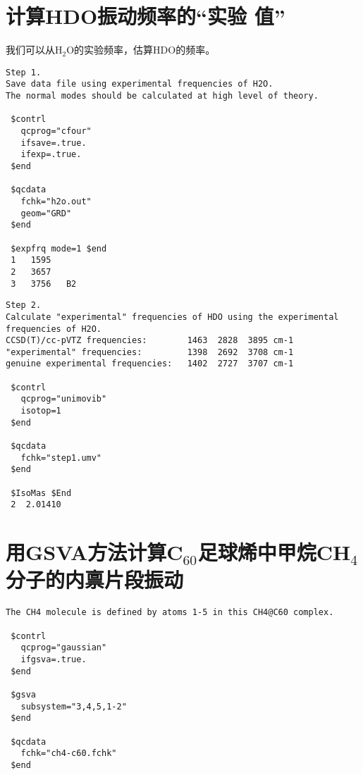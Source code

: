 \documentclass[12pt,a4paper,openany,twoside,cap,UTF8]{ctexbook}
\begin{document}
\section{计算HDO振动频率的``实验 值''} \label{sec:exp4}

我们可以从H$_2$O的实验频率，估算HDO的频率。

\begin{colorboxed}[oval=false,boxcolor=blue!75!black,bgcolor=blue!5!white]
\ttfamily\footnotesize
\begin{lstlisting}
Step 1.
Save data file using experimental frequencies of H2O.
The normal modes should be calculated at high level of theory.

 $contrl
   qcprog="cfour"
   ifsave=.true.
   ifexp=.true.
 $end

 $qcdata
   fchk="h2o.out"
   geom="GRD"
 $end

 $expfrq mode=1 $end
 1   1595
 2   3657
 3   3756   B2
\end{lstlisting}\end{colorboxed}

\begin{colorboxed}[oval=false,boxcolor=blue!75!black,bgcolor=blue!5!white]
\ttfamily\footnotesize
\begin{lstlisting}
Step 2.
Calculate "experimental" frequencies of HDO using the experimental frequencies of H2O.
CCSD(T)/cc-pVTZ frequencies:        1463  2828  3895 cm-1
"experimental" frequencies:         1398  2692  3708 cm-1
genuine experimental frequencies:   1402  2727  3707 cm-1

 $contrl
   qcprog="unimovib"
   isotop=1
 $end

 $qcdata
   fchk="step1.umv"
 $end

 $IsoMas $End
 2  2.01410
\end{lstlisting}\end{colorboxed}


\section{用GSVA方法计算C$_{60}$足球烯中甲烷CH$_4$分子的内禀片段振动 } \label{sec:gsva-example}

\begin{colorboxed}[oval=false,boxcolor=blue!75!black,bgcolor=blue!5!white]
\ttfamily\footnotesize
\begin{lstlisting}
The CH4 molecule is defined by atoms 1-5 in this CH4@C60 complex.

 $contrl
   qcprog="gaussian"
   ifgsva=.true.
 $end

 $gsva
   subsystem="3,4,5,1-2"
 $end

 $qcdata
   fchk="ch4-c60.fchk"
 $end
\end{lstlisting}\end{colorboxed}
\end{document}
